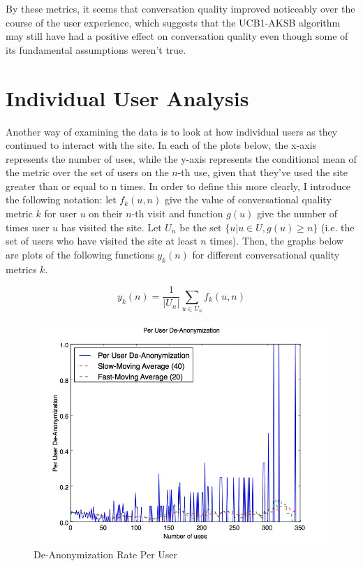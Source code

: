 By these metrics, it seems that conversation quality improved noticeably over the course of the user experience, which suggests that the UCB1-AKSB algorithm may still have had a positive effect on conversation quality even though some of its fundamental assumptions weren't true.

\section{Individual User Analysis}
\label{sec:IndividualUserAnalysis}

Another way of examining the data is to look at how individual users as they continued to interact with the site. In each of the plots below, the x-axis represents the number of uses, while the y-axis represents the conditional mean of the metric over the set of users on the $n$-th use, given that they've used the site greater than or equal to n times. In order to define this more clearly, I introduce the following notation: let $f_k(u, n)$ give the value of conversational quality metric $k$ for user $u$ on their $n$-th visit and function $g(u)$ give the number of times user $u$ has visited the site. Let $U_n$ be the set $\{u | u \in {U}, g(u) \geq{n}\}$ (i.e. the set of users who have visited the site at least $n$ times). Then, the graphs below are plots of the following functions $y_k(n)$ for different conversational quality metrics $k$.

$$ y_k(n) = \frac{1}{|U_n|}\sum_{u \in U_n}{f_k(u, n)} $$

\begin{figure}[H]
\centering
\includegraphics[trim= 0mm 0mm 0mm 0mm, clip, scale=0.5]{./Figures/PerUserDe-Anonymization.jpg}
\caption{De-Anonymization Rate Per User}
\label{fig:PerUserFBConnect}
\end{figure}


